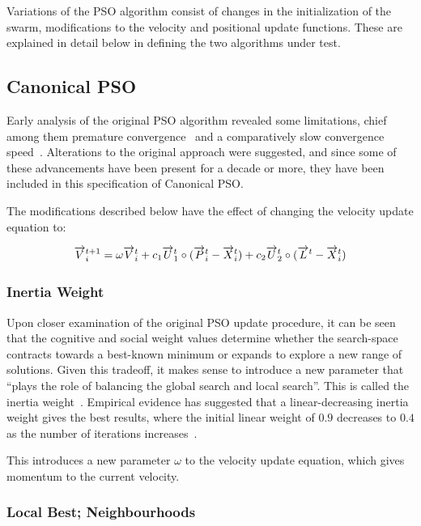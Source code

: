 \documentclass{csfourzero}
\newcommand{\rarrow}[1]{\overrightarrow{#1\vphantom{b}}}
\begin{document}
Variations of the PSO algorithm consist of changes in the initialization of the
swarm, modifications to the velocity and positional update functions. These
are explained in detail below in defining the two algorithms under test.

\subsection{Canonical PSO}

Early analysis of the original PSO algorithm revealed some limitations, chief
among them premature convergence~\cite{vandenBergh:2002tk} and a comparatively
slow convergence speed~\cite{Shi:1998kl}. Alterations to the original approach
were suggested, and since some of these advancements have been present for a
decade or more, they have been included in this specification of Canonical
PSO\@.

The modifications described below have the effect of changing the velocity
update equation to:

\begin{equation} \label{eq:canon_v_update}
\rarrow{V}_i^{t+1} = \omega \rarrow{V}_i^t + c_1 \rarrow{U}_1^t \circ (\rarrow{P}_i^t - \rarrow{X}_i^t) + c_2 \rarrow{U}^t_2 \circ (\rarrow{L}^t - \rarrow{X}_i^t)
\end{equation}

\subsubsection{Inertia Weight}

Upon closer examination of the original PSO update procedure, it can be seen
that the cognitive and social weight values determine whether the search-space
contracts towards a best-known minimum or expands to explore a new range of
solutions. Given this tradeoff, it makes sense to introduce a new parameter that
``plays the role of balancing the global search and local search''. This is
called the inertia weight~\cite{Shi:1998kl}. Empirical evidence has suggested
that a linear-decreasing inertia weight gives the best results, where the
initial linear weight of $0.9$ decreases to $0.4$ as the number of iterations
increases~\cite{Shi:1998jj}.

This introduces a new parameter $\omega$ to the velocity update equation, which
gives momentum to the current velocity.

\subsubsection{Local Best; Neighbourhoods}
\end{document}
